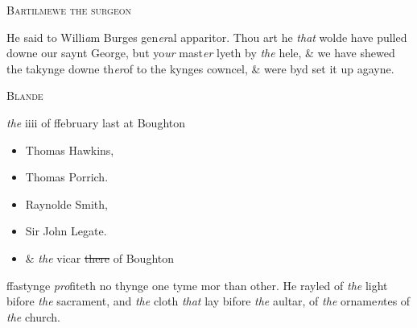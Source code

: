 \documentclass[12pt, a4paper]{book}
\begin{document}
            
            	
				\begin{center} \begin{large} {\scshape Bartilmewe the surgeon} \end{large} \end{center}
			

 
				\marginpar[\vspace{0.5cm}{\textcolor{Gray}{images}}]{}
			
		\ifthenelse{\isodd{\thepage}}
		{\reversemarginpar}
		{\normalmarginpar}
		He said to Willi\textit{a}m Burges gen\textit{er}al apparitor. Thou art he
 \textit{that} wolde have pulled downe our saynt George, but
 yo\textit{ur} mast\textit{er} lyeth by \textit{the} hele, \& we have shewed the
 takynge downe th\textit{er}of to the kynges cowncel, \& were byd
 set it up agayne.
 

            
            	
				\begin{center} \begin{large} {\scshape Blande} \end{large} \end{center}
			
               
                  
				\begin{center}  {\scshape 
                     
                        \textit{the} iiii of ffebruary last at Boughton}  \end{center}
			

               	
               		
               			\begin{itemize}
               			\item[]Thomas Hawkins,
               			\item[]Thomas Porrich.
               			\item[]Raynolde Smith,
               			\item[]Sir John Legate.
               			\item[]\& \textit{the} vicar \sout{there} of Boughton
               			\end{itemize}
               			
			
               		
		\ifthenelse{\isodd{\thepage}}
		{\reversemarginpar}
		{\normalmarginpar}
		ffastynge \textit{pro}fiteth no thynge one tyme mor than other.
 He rayled of \textit{the} light bifore \textit{the} sacrament, and \textit{the} cloth
 \textit{that} lay bifore \textit{the} aultar, of \textit{the} orname\textit{n}tes of \textit{the} church.
 
\end{document}
